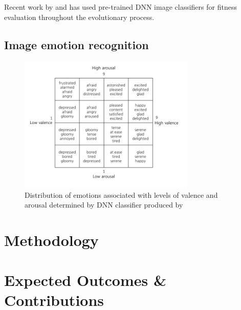 \documentclass{article}
\begin{document}
	Recent work by \citet{nguyen2015deep} and \citet{nguyen2015innovation} has used pre-trained DNN image classifiers for fitness evaluation throughout the evolutionary process.
	
	\subsection{Image emotion recognition}
	
	\begin{figure}[h!]
		\includegraphics[width=0.75\textwidth]{images/valence-arousal-grid.png}
		\caption{Distribution of emotions associated with levels of valence and arousal determined by DNN classifier produced by \citet{kim2018building}}
		\label{fig:valence-arousal}
	\end{figure}
	
	\section{Methodology}
	
	
	\section{Expected Outcomes \& Contributions}
	
	
	
	
	
\end{document}
